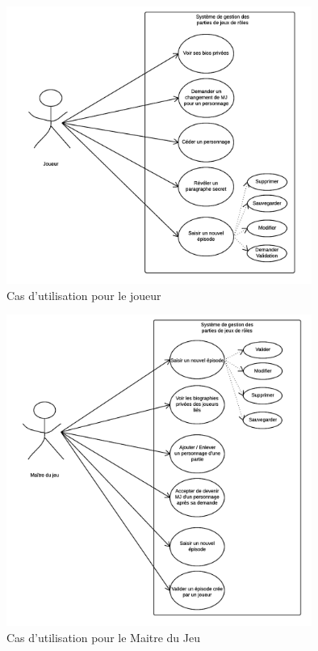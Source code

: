 \documentclass[a4paper,oneside,10pt]{article}
\begin{document}
\begin{figure}[!ht]
	\begin{center}
\includegraphics[width=10cm]{images/utilisation/JoueurCU.png}
	\caption{Cas d'utilisation pour le joueur}
\end{center}
\end{figure}
\begin{figure}[!ht]
	\begin{center}
\includegraphics[width=10cm]{images/utilisation/MJCU.png}  
	\caption{Cas d'utilisation pour le Maitre du Jeu}
\end{center}
\end{figure}
\end{document}
